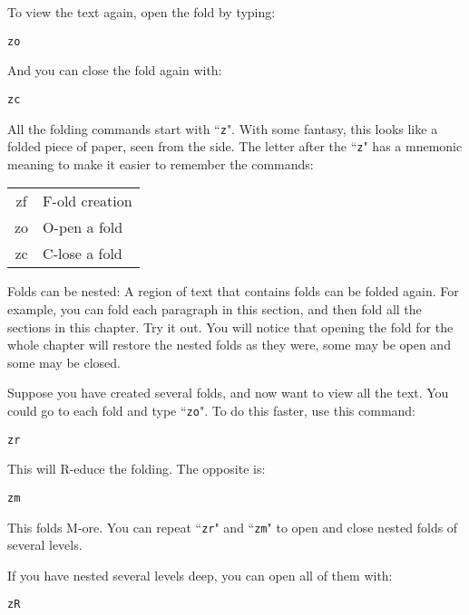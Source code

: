 To view the text again, open the fold by typing:

\begin{Verbatim}[samepage=true]
 zo
\end{Verbatim}

And you can close the fold again with:

\begin{Verbatim}[samepage=true]
 zc
\end{Verbatim}

All the folding commands start with ``\texttt{z}".
With some fantasy, this looks like a folded piece of paper, seen from the side.
The letter after the ``\texttt{z}" has a mnemonic meaning to make it easier to remember the commands:
\begin{center} \begin{tabular}{c l}
				zf & F-old creation \\
				zo & O-pen a fold \\
				zc & C-lose a fold \\
\end{tabular} \end{center}

Folds can be nested: A region of text that contains folds can be folded again.
For example, you can fold each paragraph in this section, and then fold all the sections in this chapter.
Try it out.
You will notice that opening the fold for the whole chapter will restore the nested folds as they were, some may be open and some may be closed.

Suppose you have created several folds, and now want to view all the text.
You could go to each fold and type ``\texttt{zo}".
To do this faster, use this command:

\begin{Verbatim}[samepage=true]
 zr
\end{Verbatim}

This will R-educe the folding.
The opposite is:

\begin{Verbatim}[samepage=true]
 zm
\end{Verbatim}

This folds M-ore.
You can repeat ``\texttt{zr}" and ``\texttt{zm}" to open and close nested folds of several levels.

If you have nested several levels deep, you can open all of them with:

\begin{Verbatim}[samepage=true]
 zR
\end{Verbatim}

